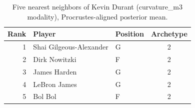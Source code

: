 \begin{table}[htbp]
  \centering\small
  \begin{tabular}{rllc}
    \toprule
    Rank & Player & Position & Archetype \\
    \midrule
    1 & Shai Gilgeous-Alexander & G & 2 \\
    2 & Dirk Nowitzki & F & 2 \\
    3 & James Harden & G & 2 \\
    4 & LeBron James & G & 2 \\
    5 & Bol Bol & F & 2 \\
    \bottomrule
  \end{tabular}
  \caption{Five nearest neighbors of Kevin Durant (curvature_m3 modality), Procrustes-aligned posterior mean.}
  \label{tab:Kevin_Durant_neighbors_curvature_m3}
\end{table}

